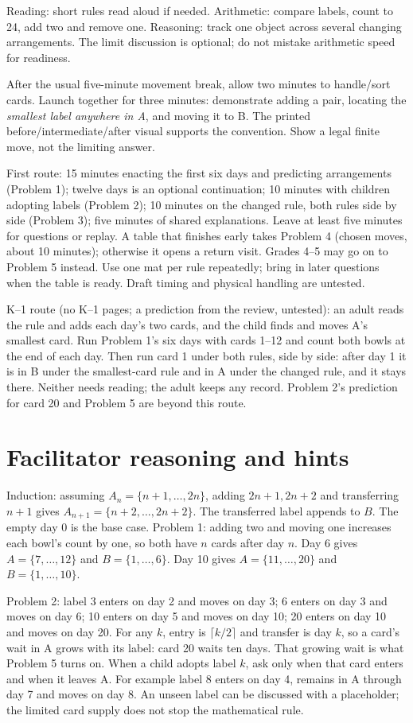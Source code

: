 \documentclass[11pt,letterpaper]{article}
\begin{document}
Reading: short rules read aloud if needed. Arithmetic: compare labels, count to 24, add two and remove one. Reasoning: track one object across several changing arrangements. The limit discussion is optional; do not mistake arithmetic speed for readiness.

After the usual five-minute movement break, allow two minutes to handle/sort cards. Launch together for three minutes: demonstrate adding a pair, locating the \emph{smallest label anywhere in A}, and moving it to B. The printed before/intermediate/after visual supports the convention. Show a legal finite move, not the limiting answer.

First route: 15 minutes enacting the first six days and predicting arrangements (Problem 1); twelve days is an optional continuation; 10 minutes with children adopting labels (Problem 2); 10 minutes on the changed rule, both rules side by side (Problem 3); five minutes of shared explanations. Leave at least five minutes for questions or replay. A table that finishes early takes Problem 4 (chosen moves, about 10 minutes); otherwise it opens a return visit. Grades 4--5 may go on to Problem 5 instead. Use one mat per rule repeatedly; bring in later questions when the table is ready. Draft timing and physical handling are untested.

K--1 route (no K--1 pages; a prediction from the review, untested): an adult reads the rule and adds each day's two cards, and the child finds and moves A's smallest card. Run Problem 1's six days with cards 1--12 and count both bowls at the end of each day. Then run card 1 under both rules, side by side: after day 1 it is in B under the smallest-card rule and in A under the changed rule, and it stays there. Neither needs reading; the adult keeps any record. Problem 2's prediction for card 20 and Problem 5 are beyond this route.
\newpage
\section*{Facilitator reasoning and hints}
Induction: assuming $A_n=\{n+1,\ldots,2n\}$, adding $2n+1,2n+2$ and transferring $n+1$ gives $A_{n+1}=\{n+2,\ldots,2n+2\}$. The transferred label appends to $B$. The empty day 0 is the base case. Problem 1: adding two and moving one increases each bowl's count by one, so both have $n$ cards after day $n$. Day 6 gives $A=\{7,\ldots,12\}$ and $B=\{1,\ldots,6\}$. Day 10 gives $A=\{11,\ldots,20\}$ and $B=\{1,\ldots,10\}$.

Problem 2: label 3 enters on day 2 and moves on day 3; 6 enters on day 3 and moves on day 6; 10 enters on day 5 and moves on day 10; 20 enters on day 10 and moves on day 20. For any $k$, entry is $\lceil k/2\rceil$ and transfer is day $k$, so a card's wait in A grows with its label: card 20 waits ten days. That growing wait is what Problem 5 turns on. When a child adopts label $k$, ask only when that card enters and when it leaves A. For example label 8 enters on day 4, remains in A through day 7 and moves on day 8. An unseen label can be discussed with a placeholder; the limited card supply does not stop the mathematical rule.
\end{document}
